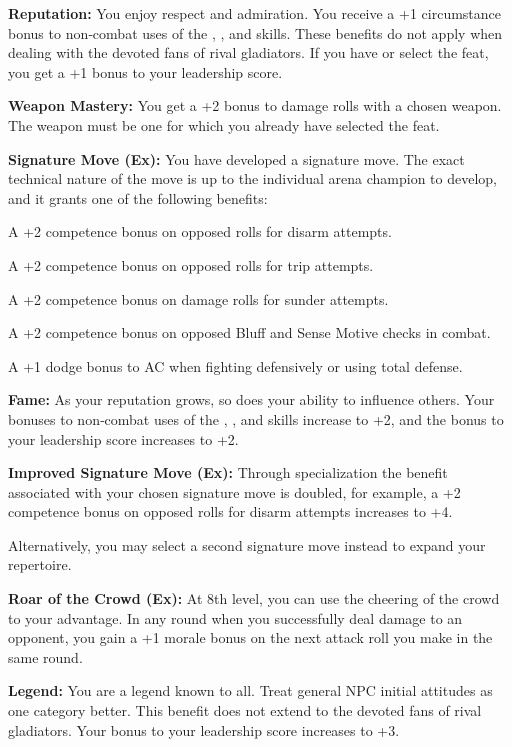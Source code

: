 \textbf{Reputation:} You enjoy respect and admiration. You receive a +1 circumstance bonus to non‐combat uses of the , ,  and  skills. These benefits do not apply when dealing with the devoted fans of rival gladiators. If you have or select the  feat, you get a +1 bonus to your leadership score.

\textbf{Weapon Mastery:} You get a +2 bonus to damage rolls with a chosen weapon. The weapon must be one for which you already have selected the  feat.

\textbf{Signature Move (Ex):} You have developed a signature move. The exact technical nature of the move is up to the individual arena champion to develop, and it grants one of the following benefits:
\begin{itemize*}
\item A +2 competence bonus on opposed rolls for disarm attempts.
\item A +2 competence bonus on opposed rolls for trip attempts.
\item A +2 competence bonus on damage rolls for sunder attempts.
\item A +2 competence bonus on opposed Bluff and Sense Motive checks in combat.
\item A +1 dodge bonus to AC when fighting defensively or using total defense.
\end{itemize*}

\textbf{Fame:} As your reputation grows, so does your ability to influence others. Your bonuses to non‐combat uses of the , ,  and  skills increase to +2, and the bonus to your leadership score increases to +2.

\textbf{Improved Signature Move (Ex):} Through specialization the benefit associated with your chosen signature move is doubled, for example, a +2 competence bonus on opposed rolls for disarm attempts increases to +4.

Alternatively, you may select a second signature move instead to expand your repertoire.

\textbf{Roar of the Crowd (Ex):} At 8th level, you can use the cheering of the crowd to your advantage. In any round when you successfully deal damage to an opponent, you gain a +1 morale bonus on the next attack roll you make in the same round.

\textbf{Legend:} You are a legend known to all. Treat general NPC initial attitudes as one category better. This benefit does not extend to the devoted fans of rival gladiators. Your bonus to your leadership score increases to +3.

